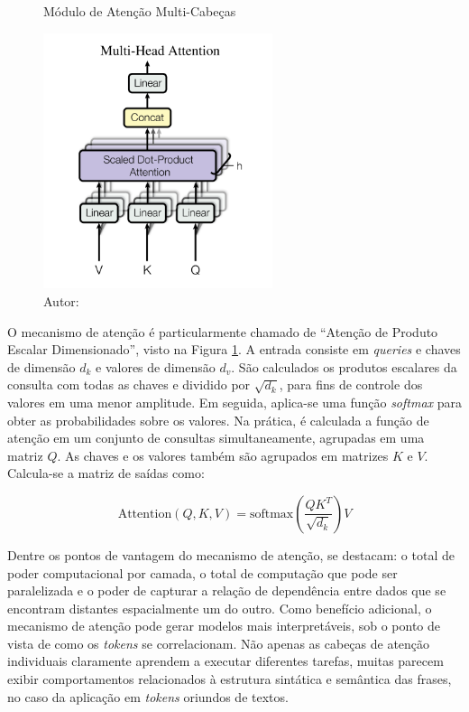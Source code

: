 \begin{figure}[htbp]
    \centering
    \captionsetup{width=0.98\textwidth, justification=justified}
    \caption{Módulo de Atenção Multi-Cabeças}
    \includegraphics[width=0.6\textwidth]{figures/fig005.png}
    \caption*{Autor:\cite{vaswaniAttentionAllYou2023}}
    \label{fig:fig005}
\end{figure}

O mecanismo de atenção é particularmente chamado de ``Atenção de Produto Escalar Dimensionado'', visto na Figura \ref{fig:fig005}. A entrada consiste em \textit{queries} e chaves de dimensão $d_{k}$ e valores de dimensão $d_{v}$. São calculados os produtos escalares da consulta com todas as chaves e dividido por $\sqrt{d_{k}}$, para fins de controle dos valores em uma menor amplitude. Em seguida, aplica-se uma função \textit{softmax} para obter as probabilidades sobre os valores. Na prática, é calculada a função de atenção em um conjunto de consultas simultaneamente, agrupadas em uma matriz $Q$. As chaves e os valores também são agrupados em matrizes $K$ e $V$. Calcula-se a matriz de saídas como:

\begin{equation}
\text{Attention}(Q, K, V) = \text{softmax}\left(\frac{QK^T}{\sqrt{d_k}}\right)V
\label{eq:attention}
\end{equation}

Dentre os pontos de vantagem do mecanismo de atenção, se destacam: o total de poder computacional por camada, o total de computação que pode ser paralelizada e o poder de capturar a relação de dependência entre dados que se encontram distantes espacialmente um do outro. Como benefício adicional, o mecanismo de atenção pode gerar modelos mais interpretáveis, sob o ponto de vista de como os \textit{tokens} se correlacionam. Não apenas as cabeças de atenção individuais claramente aprendem a executar diferentes tarefas, muitas parecem exibir comportamentos relacionados à estrutura sintática e semântica das frases, no caso da aplicação em \textit{tokens} oriundos de textos.

